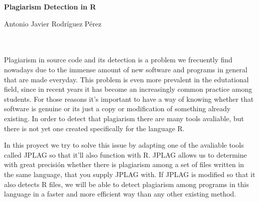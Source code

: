 \cleardoublepage


\thispagestyle{empty}


\begin{center}
{\large\bfseries Plagiarism Detection in R}\\
\end{center}
\begin{center}
Antonio Javier Rodríguez Pérez\\
\end{center}

\\

\vspace{0.7cm}
\\

Plagiarism in source code and its detection is a problem we frecuently find nowadays due to the immense amount of new software and programs in general that are made everyday.
\newline
This problem is even more prevalent in the edutational field, since in recent years it has become an increasingly common practice among students.
\newline
For those reasons it's important to have a way of knowing whether that software is genuine or its just a copy or modification of something already existing.
\newline
In order to detect that plagiarism there are many tools avaliable, but there is not yet one created specifically for the language R.

\vspace{0.3cm}

In this proyect we try to solve this issue by adapting one of the avaliable tools called JPLAG so that it'll also function with R.
\newline
JPLAG allows us to determine with great precisión whether there is plagiarism among a set of files written in the same language, that you supply JPLAG with.
\newline
If JPLAG is modified so that it also detects R files, we will be able to detect plagiarism among programs in this language in a faster and more efficient way than any other existing method. 

\chapter*{}
\thispagestyle{empty}

